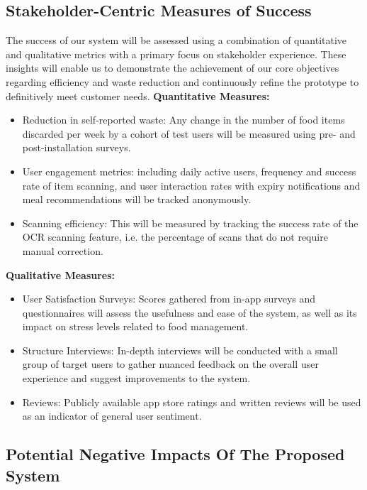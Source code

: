 \subsection{Stakeholder-Centric Measures of Success}
\par
\noindent The success of our system will be assessed using a combination of quantitative and qualitative metrics with a primary focus on stakeholder experience. These insights will enable us to demonstrate the achievement of our core objectives regarding efficiency and waste reduction and continuously refine the prototype to definitively meet customer needs.
\vspace{1pt}
\textbf{Quantitative Measures:}
\begin{itemize}
\item Reduction in self-reported waste: Any change in the number of food items discarded per week by a cohort of test users will be measured using pre- and post-installation surveys.
\item User engagement metrics: including daily active users, frequency and success rate of item scanning, and user interaction rates with expiry notifications and meal recommendations will be tracked anonymously.
\item Scanning efficiency: This will be measured by tracking the success rate of the OCR scanning feature, i.e. the percentage of scans that do not require manual correction.
\end{itemize}

\vspace{1pt}

\textbf{Qualitative Measures:}
\begin{itemize}
\item User Satisfaction Surveys: Scores gathered from in-app surveys and questionnaires will assess the usefulness and ease of the system, as well as its impact on stress levels related to food management.
\item Structure Interviews: In-depth interviews will be conducted with a small group of target users to gather nuanced feedback on the overall user experience and suggest improvements to the system.
\item Reviews: Publicly available app store ratings and written reviews will be used as an indicator of general user sentiment.
\end{itemize}
\subsection{Potential Negative Impacts Of The Proposed System}


